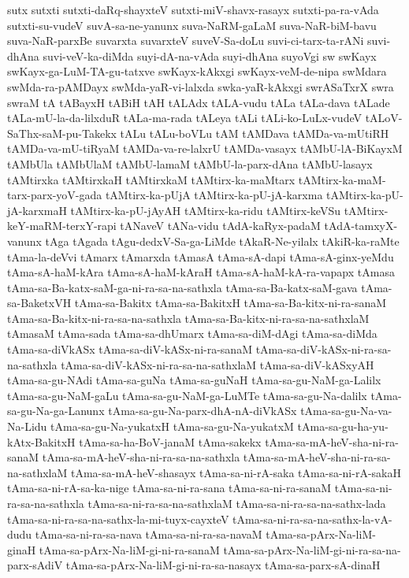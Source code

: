 {sutx
sutxti
sutxti-daRq-shayxteV
sutxti-miV-shavx-rasayx
sutxti-pa-ra-vAda
sutxti-su-vudeV
suvA-sa-ne-yanunx
suva-NaRM-gaLaM
suva-NaR-biM-bavu
suva-NaR-parxBe
suvarxta
suvarxteV
suveV-Sa-doLu
suvi-ci-tarx-ta-rANi
suvi-dhAna
suvi-veV-ka-diMda
suyi-dA-na-vAda
suyi-dhAna
suyoVgi
sw
swKayx
swKayx-ga-LuM-TA-gu-tatxve
swKayx-kAkxgi
swKayx-veM-de-nipa
swMdara
swMda-ra-pAMDayx
swMda-yaR-vi-lalxda
swka-yaR-kAkxgi
swrASaTxrX
swra
swraM
tA
tABayxH
tABiH
tAH
tALAdx
tALA-vudu
tALa
tALa-dava
tALade
tALa-mU-la-da-lilxduR
tALa-ma-rada
tALeya
tALi
tALi-ko-LuLx-vudeV
tALoV-SaThx-saM-pu-Takekx
tALu
tALu-boVLu
tAM
tAMDava
tAMDa-va-mUtiRH
tAMDa-va-mU-tiRyaM
tAMDa-va-re-lalxrU
tAMDa-vasayx
tAMbU-lA-BiKayxM
tAMbUla
tAMbUlaM
tAMbU-lamaM
tAMbU-la-parx-dAna
tAMbU-lasayx
tAMtirxka
tAMtirxkaH
tAMtirxkaM
tAMtirx-ka-maMtarx
tAMtirx-ka-maM-tarx-parx-yoV-gada
tAMtirx-ka-pUjA
tAMtirx-ka-pU-jA-karxma
tAMtirx-ka-pU-jA-karxmaH
tAMtirx-ka-pU-jAyAH
tAMtirx-ka-ridu
tAMtirx-keVSu
tAMtirx-keY-maRM-terxY-rapi
tANaveV
tANa-vidu
tAdA-kaRyx-padaM
tAdA-tamxyX-vanunx
tAga
tAgada
tAgu-dedxV-Sa-ga-LiMde
tAkaR-Ne-yilalx
tAkiR-ka-raMte
tAma-la-deVvi
tAmarx
tAmarxda
tAmasA
tAma-sA-dapi
tAma-sA-ginx-yeMdu
tAma-sA-haM-kAra
tAma-sA-haM-kAraH
tAma-sA-haM-kA-ra-vapapx
tAmasa
tAma-sa-Ba-katx-saM-ga-ni-ra-sa-na-sathxla
tAma-sa-Ba-katx-saM-gava
tAma-sa-BaketxVH
tAma-sa-Bakitx
tAma-sa-BakitxH
tAma-sa-Ba-kitx-ni-ra-sanaM
tAma-sa-Ba-kitx-ni-ra-sa-na-sathxla
tAma-sa-Ba-kitx-ni-ra-sa-na-sathxlaM
tAmasaM
tAma-sada
tAma-sa-dhUmarx
tAma-sa-diM-dAgi
tAma-sa-diMda
tAma-sa-diVkASx
tAma-sa-diV-kASx-ni-ra-sanaM
tAma-sa-diV-kASx-ni-ra-sa-na-sathxla
tAma-sa-diV-kASx-ni-ra-sa-na-sathxlaM
tAma-sa-diV-kASxyAH
tAma-sa-gu-NAdi
tAma-sa-guNa
tAma-sa-guNaH
tAma-sa-gu-NaM-ga-Lalilx
tAma-sa-gu-NaM-gaLu
tAma-sa-gu-NaM-ga-LuMTe
tAma-sa-gu-Na-dalilx
tAma-sa-gu-Na-ga-Lanunx
tAma-sa-gu-Na-parx-dhA-nA-diVkASx
tAma-sa-gu-Na-va-Na-Lidu
tAma-sa-gu-Na-yukatxH
tAma-sa-gu-Na-yukatxM
tAma-sa-gu-ha-yu-kAtx-BakitxH
tAma-sa-ha-BoV-janaM
tAma-sakekx
tAma-sa-mA-heV-sha-ni-ra-sanaM
tAma-sa-mA-heV-sha-ni-ra-sa-na-sathxla
tAma-sa-mA-heV-sha-ni-ra-sa-na-sathxlaM
tAma-sa-mA-heV-shasayx
tAma-sa-ni-rA-saka
tAma-sa-ni-rA-sakaH
tAma-sa-ni-rA-sa-ka-nige
tAma-sa-ni-ra-sana
tAma-sa-ni-ra-sanaM
tAma-sa-ni-ra-sa-na-sathxla
tAma-sa-ni-ra-sa-na-sathxlaM
tAma-sa-ni-ra-sa-na-sathx-lada
tAma-sa-ni-ra-sa-na-sathx-la-mi-tuyx-cayxteV
tAma-sa-ni-ra-sa-na-sathx-la-vA-dudu
tAma-sa-ni-ra-sa-nava
tAma-sa-ni-ra-sa-navaM
tAma-sa-pArx-Na-liM-ginaH
tAma-sa-pArx-Na-liM-gi-ni-ra-sanaM
tAma-sa-pArx-Na-liM-gi-ni-ra-sa-na-parx-sAdiV
tAma-sa-pArx-Na-liM-gi-ni-ra-sa-nasayx
tAma-sa-parx-sA-dinaH
}
